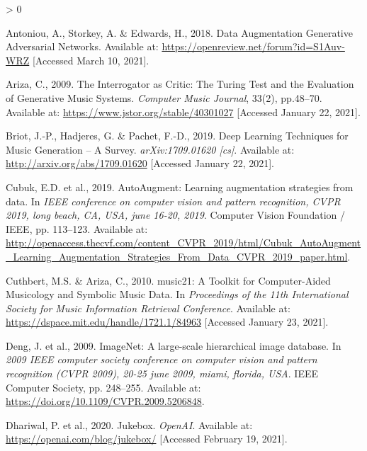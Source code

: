 \documentclass[12pt,a4paper,]{report}
\newlength{\cslhangindent}
\newenvironment{CSLReferences}[2] %
 {%
  \setlength{\parindent}{0pt}
  \ifodd #1 \everypar{\setlength{\hangindent}{\cslhangindent}}\ignorespaces\fi
  \ifnum #2 > 0
  \setlength{\parskip}{#2\baselineskip}
  \fi
 }%
 {}
\begin{document}
\hypertarget{refs}{}
\begin{CSLReferences}{1}{0}
\leavevmode\hypertarget{ref-antoniou_data_2018}{}%
Antoniou, A., Storkey, A. \& Edwards, H., 2018. Data {Augmentation}
{Generative} {Adversarial} {Networks}. Available at:
\url{https://openreview.net/forum?id=S1Auv-WRZ} {[}Accessed March 10,
2021{]}.

\leavevmode\hypertarget{ref-ariza_interrogator_2009}{}%
Ariza, C., 2009. The {Interrogator} as {Critic}: {The} {Turing} {Test}
and the {Evaluation} of {Generative} {Music} {Systems}. \emph{Computer
Music Journal}, 33(2), pp.48--70. Available at:
\url{https://www.jstor.org/stable/40301027} {[}Accessed January 22,
2021{]}.

\leavevmode\hypertarget{ref-briot_deep_2019}{}%
Briot, J.-P., Hadjeres, G. \& Pachet, F.-D., 2019. Deep {Learning}
{Techniques} for {Music} {Generation} -- {A} {Survey}.
\emph{arXiv:1709.01620 {[}cs{]}}. Available at:
\url{http://arxiv.org/abs/1709.01620} {[}Accessed January 22, 2021{]}.

\leavevmode\hypertarget{ref-cubuk_autoaugment_2019}{}%
Cubuk, E.D. et al., 2019. AutoAugment: Learning augmentation strategies
from data. In \emph{{IEEE} conference on computer vision and pattern
recognition, {CVPR} 2019, long beach, CA, USA, june 16-20, 2019}.
Computer Vision Foundation / {IEEE}, pp. 113--123. Available at:
\url{http://openaccess.thecvf.com/content_CVPR_2019/html/Cubuk_AutoAugment_Learning_Augmentation_Strategies_From_Data_CVPR_2019_paper.html}.

\leavevmode\hypertarget{ref-cuthbert_music21_2010}{}%
Cuthbert, M.S. \& Ariza, C., 2010. music21: {A} {Toolkit} for
{Computer}-{Aided} {Musicology} and {Symbolic} {Music} {Data}. In
\emph{Proceedings of the 11th {International} {Society} for {Music}
{Information} {Retrieval} {Conference}}. Available at:
\url{https://dspace.mit.edu/handle/1721.1/84963} {[}Accessed January 23,
2021{]}.

\leavevmode\hypertarget{ref-deng_imagenet_2009}{}%
Deng, J. et al., 2009. ImageNet: {A} large-scale hierarchical image
database. In \emph{2009 {IEEE} computer society conference on computer
vision and pattern recognition {(CVPR} 2009), 20-25 june 2009, miami,
florida, {USA}}. {IEEE} Computer Society, pp. 248--255. Available at:
\url{https://doi.org/10.1109/CVPR.2009.5206848}.

\leavevmode\hypertarget{ref-dhariwal_jukebox_2020}{}%
Dhariwal, P. et al., 2020. Jukebox. \emph{OpenAI}. Available at:
\url{https://openai.com/blog/jukebox/} {[}Accessed February 19, 2021{]}.


\end{CSLReferences}
\end{document}
